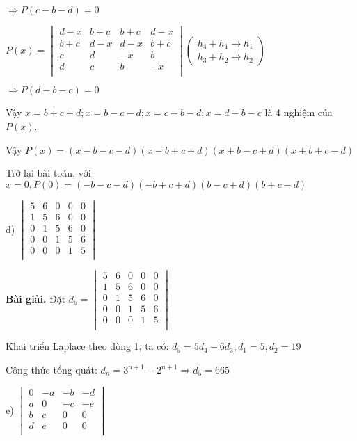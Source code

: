 \documentclass[12pt]{report}
\begin{document}
$\Rightarrow P(c-b-d) = 0$

$P(x) = \begin{vmatrix}
	d-x & b+c & b+c & d-x \\
	b+c & d-x & d-x & b+c \\
	c & d & -x & b \\
	d & c & b & -x \\
\end{vmatrix} \left( \begin{smallmatrix}
	h_4+h_1 \to h_1\\
	h_3+h_2 \to h_2
\end{smallmatrix} \right)$

$\Rightarrow P(d-b-c) = 0$

Vậy $x=b+c+d; x=b-c-d; x=c-b-d; x=d-b-c$ là 4 nghiệm của $P(x)$.

Vậy $P(x)=(x-b-c-d)(x-b+c+d)(x+b-c+d)(x+b+c-d)$  

Trở lại bài toán, với $x = 0, P(0) = (-b-c-d)(-b+c+d)(b-c+d)(b+c-d)$

d) $\begin{vmatrix}
	5 & 6 & 0 & 0 & 0 \\
	1 & 5 & 6 & 0 & 0 \\
	0 & 1 & 5 & 6 & 0 \\
	0 & 0 & 1 & 5 & 6 \\
	0 & 0 & 0 & 1 & 5 \\
\end{vmatrix}$

\textbf{Bài giải.} Đặt $d_5 = \begin{vmatrix}
	5 & 6 & 0 & 0 & 0 \\
	1 & 5 & 6 & 0 & 0 \\
	0 & 1 & 5 & 6 & 0 \\
	0 & 0 & 1 & 5 & 6 \\
	0 & 0 & 0 & 1 & 5 \\
\end{vmatrix}$

Khai triển Laplace theo dòng 1, ta có: $d_5 = 5d_4 -6d_3; d_1 = 5, d_2 = 19$

Công thức tổng quát: $d_n = 3^{n+1} - 2^{n+1} \Rightarrow d_5 = 665$

e) $\begin{vmatrix}
	0 & -a & -b & -d \\
	a & 0 & -c & -e \\
	b & c & 0 & 0 \\
	d & e & 0 & 0 \\
\end{vmatrix}$
\end{document}
